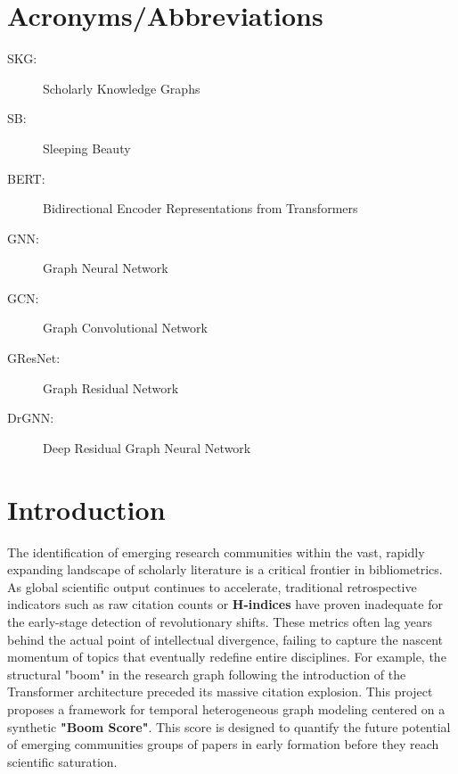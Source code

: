 \documentclass[a4paper,12pt]{article}
\begin{document}
\listoffigures
\newpage

\section*{Acronyms/Abbreviations}
\begin{description}
    \item[SKG:] Scholarly Knowledge Graphs
    \item[SB:] Sleeping Beauty
    \item[BERT:] Bidirectional Encoder Representations from Transformers
    \item[GNN:] Graph Neural Network
    \item[GCN:] Graph Convolutional Network
    \item[GResNet:] Graph Residual Network
    \item[DrGNN:] Deep Residual Graph Neural Network
\end{description}

\newpage

\setcounter{page}{1}

\section{Introduction}
The identification of emerging research communities within the vast, rapidly expanding 
landscape of scholarly literature is a critical frontier in bibliometrics. As global 
scientific output continues to accelerate, traditional retrospective indicators such 
as raw citation counts or \textbf{H-indices} have proven inadequate for the early-stage 
detection of revolutionary shifts. These metrics often lag years behind the actual 
point of intellectual divergence, failing to capture the nascent momentum of topics 
that eventually redefine entire disciplines. For example, the structural "boom" in the 
research graph following the introduction of the Transformer architecture preceded its 
massive citation explosion. This project proposes a framework for temporal heterogeneous 
graph modeling centered on a synthetic \textbf{"Boom Score"}. This score is designed to quantify 
the future potential of emerging communities groups of papers in early formation before 
they reach scientific saturation.
\end{document}
